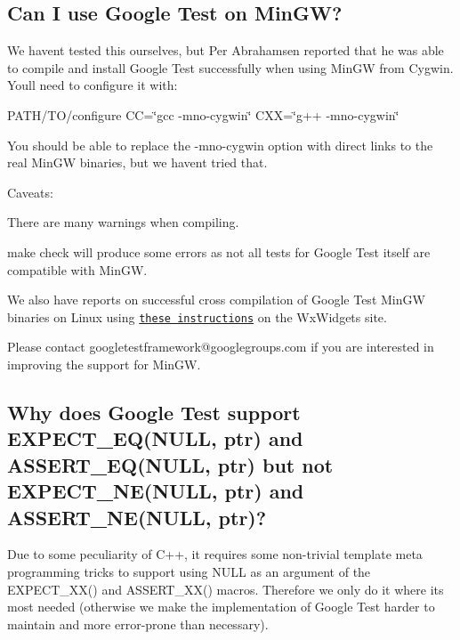 \subsection*{Can I use Google Test on Min\+GW?}

We haven\textquotesingle{}t tested this ourselves, but Per Abrahamsen reported that he was able to compile and install Google Test successfully when using Min\+GW from Cygwin. You\textquotesingle{}ll need to configure it with\+:

{\ttfamily P\+A\+T\+H/\+T\+O/configure CC=\char`\"{}gcc -\/mno-\/cygwin\char`\"{} C\+XX=\char`\"{}g++ -\/mno-\/cygwin\char`\"{}}

You should be able to replace the {\ttfamily -\/mno-\/cygwin} option with direct links to the real Min\+GW binaries, but we haven\textquotesingle{}t tried that.

Caveats\+:


\begin{DoxyItemize}
\item There are many warnings when compiling.
\item {\ttfamily make check} will produce some errors as not all tests for Google Test itself are compatible with Min\+GW.
\end{DoxyItemize}

We also have reports on successful cross compilation of Google Test Min\+GW binaries on Linux using \href{http://wiki.wxwidgets.org/Cross-Compiling_Under_Linux#Cross-compiling_under_Linux_for_MS_Windows}{\tt these instructions} on the Wx\+Widgets site.

Please contact {\ttfamily googletestframework@googlegroups.\+com} if you are interested in improving the support for Min\+GW.

\subsection*{Why does Google Test support E\+X\+P\+E\+C\+T\+\_\+\+E\+Q(\+N\+U\+L\+L, ptr) and A\+S\+S\+E\+R\+T\+\_\+\+E\+Q(\+N\+U\+L\+L, ptr) but not E\+X\+P\+E\+C\+T\+\_\+\+N\+E(\+N\+U\+L\+L, ptr) and A\+S\+S\+E\+R\+T\+\_\+\+N\+E(\+N\+U\+L\+L, ptr)?}

Due to some peculiarity of C++, it requires some non-\/trivial template meta programming tricks to support using {\ttfamily N\+U\+LL} as an argument of the {\ttfamily E\+X\+P\+E\+C\+T\+\_\+\+X\+X()} and {\ttfamily A\+S\+S\+E\+R\+T\+\_\+\+X\+X()} macros. Therefore we only do it where it\textquotesingle{}s most needed (otherwise we make the implementation of Google Test harder to maintain and more error-\/prone than necessary).

